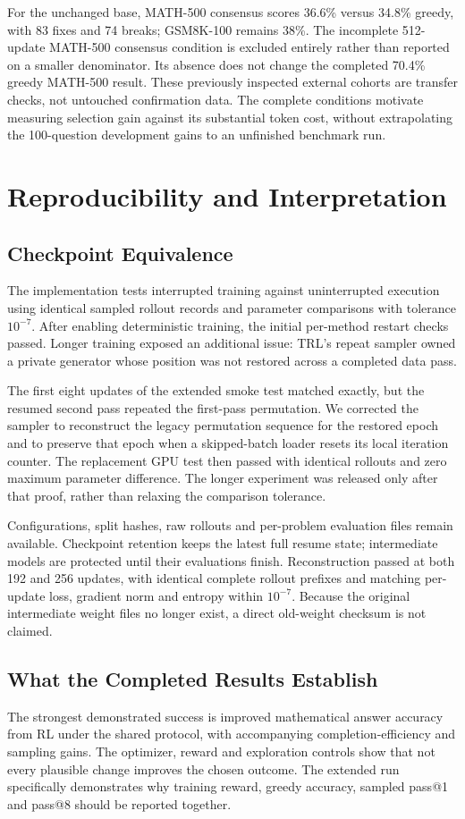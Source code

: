 \documentclass[conference]{IEEEtran}
\begin{document}
For the unchanged base, MATH-500 consensus scores 36.6\% versus 34.8\% greedy, with 83 fixes and 74 breaks; GSM8K-100 remains 38\%. The incomplete 512-update MATH-500 consensus condition is excluded entirely rather than reported on a smaller denominator. Its absence does not change the completed 70.4\% greedy MATH-500 result. These previously inspected external cohorts are transfer checks, not untouched confirmation data. The complete conditions motivate measuring selection gain against its substantial token cost, without extrapolating the 100-question development gains to an unfinished benchmark run.

\section{Reproducibility and Interpretation}
\subsection{Checkpoint Equivalence}
The implementation tests interrupted training against uninterrupted execution using identical sampled rollout records and parameter comparisons with tolerance $10^{-7}$. After enabling deterministic training, the initial per-method restart checks passed. Longer training exposed an additional issue: TRL's repeat sampler owned a private generator whose position was not restored across a completed data pass.

The first eight updates of the extended smoke test matched exactly, but the resumed second pass repeated the first-pass permutation. We corrected the sampler to reconstruct the legacy permutation sequence for the restored epoch and to preserve that epoch when a skipped-batch loader resets its local iteration counter. The replacement GPU test then passed with identical rollouts and zero maximum parameter difference. The longer experiment was released only after that proof, rather than relaxing the comparison tolerance.

Configurations, split hashes, raw rollouts and per-problem evaluation files remain available. Checkpoint retention keeps the latest full resume state; intermediate models are protected until their evaluations finish. Reconstruction passed at both 192 and 256 updates, with identical complete rollout prefixes and matching per-update loss, gradient norm and entropy within $10^{-7}$. Because the original intermediate weight files no longer exist, a direct old-weight checksum is not claimed.

\subsection{What the Completed Results Establish}
The strongest demonstrated success is improved mathematical answer accuracy from RL under the shared protocol, with accompanying completion-efficiency and sampling gains. The optimizer, reward and exploration controls show that not every plausible change improves the chosen outcome. The extended run specifically demonstrates why training reward, greedy accuracy, sampled pass@1 and pass@8 should be reported together.
\end{document}
